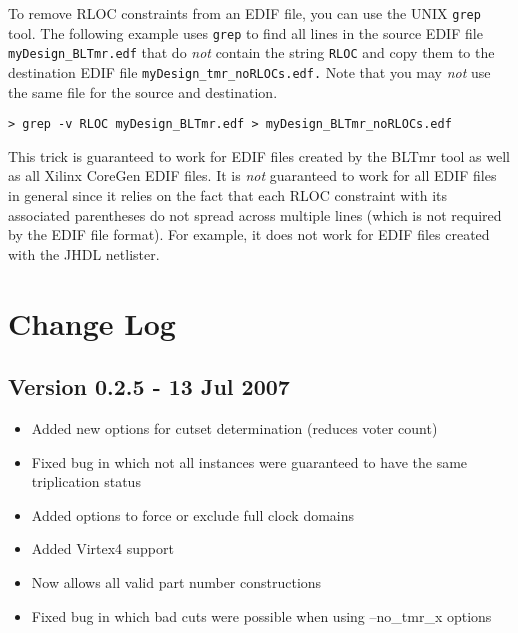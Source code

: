 \documentclass[english]{article}
\begin{document}
To remove RLOC constraints from an EDIF file, you can use the UNIX 
\texttt{grep} tool. The following example uses \texttt{grep} to find all lines 
in the source EDIF file \texttt{myDesign\_BLTmr.edf} that do \emph{not} contain 
the string \texttt{RLOC} and copy them to the destination EDIF file 
\texttt{myDesign\_tmr\_noRLOCs.edf.} Note that you may \emph{not} use the same 
file for the source and destination.

\begin{verbatim}
> grep -v RLOC myDesign_BLTmr.edf > myDesign_BLTmr_noRLOCs.edf
\end{verbatim}

This trick is guaranteed to work for EDIF files created by the BLTmr tool as 
well as all Xilinx CoreGen EDIF files. It is \emph{not} guaranteed to work for 
all EDIF files in general since it relies on the fact that each RLOC constraint 
with its associated parentheses do not spread across multiple lines (which is 
not required by the EDIF file format). For example, it does not work for EDIF 
files created with the JHDL netlister.

\section{Change Log}

\subsection*{Version 0.2.5 - 13 Jul 2007}
\begin{itemize}
\item Added new options for cutset determination (reduces voter count)
\item Fixed bug in which not all instances were guaranteed to have the same triplication status
\item Added options to force or exclude full clock domains
\item Added Virtex4 support
\item Now allows all valid part number constructions
\item Fixed bug in which bad cuts were possible when using --no\_tmr\_x options
\end{itemize}
\end{document}
